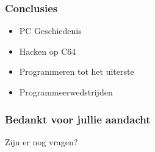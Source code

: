 \documentclass[aspectratio=43]{uva-inf-presentation}
\begin{document}

\begin{frame}
\frametitle{Conclusies}

\begin{itemize}
\item PC Geschiedenis
\item Hacken op C64
\item Programmeren tot het uiterste
\item Programmeerwedstrijden
\end{itemize}

\end{frame}





\begin{frame}
\frametitle{Bedankt voor jullie aandacht}
\Large{\centerline{Zijn er nog vragen?}}
\end{frame}
\end{document}
